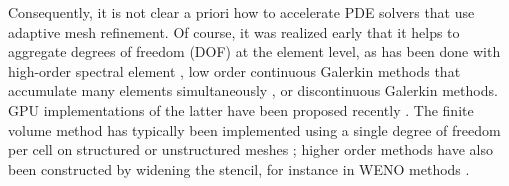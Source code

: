 \documentclass{IOS-Book-Article}     %
\newcommand{\comment}[1]{\textcolor{green}{[DAC: #1]}\xspace}
\newcommand{\todo}[1]{\textcolor{red}{[TODO: #1]}\xspace}
\begin{document}
Consequently, it is not clear a priori how to accelerate PDE solvers
that use adaptive mesh refinement.
Of course, it was realized early that it helps to aggregate degrees of
freedom (DOF) at the element level, as has been done with high-order
spectral element \cite{TufoFischer99}, low order continuous Galerkin methods that accumulate many elements simultaneously \cite{knepleyterrel:2013},
or discontinuous Galerkin \cite{HesthavenWarburton02}
methods.  GPU implementations of the latter have been proposed recently
\cite{KlocknerWarburtonBridgeEtAl09, BursteddeGhattasGurnisEtAl10}.
The finite volume method has typically been implemented using a single degree
of freedom per cell on
structured
\cite{ppm, clawpack}
or unstructured meshes
\cite{openfoam};
higher order methods have also been constructed by widening the stencil, for instance in WENO methods
\cite{Shu:2009bi}.

\end{document}
